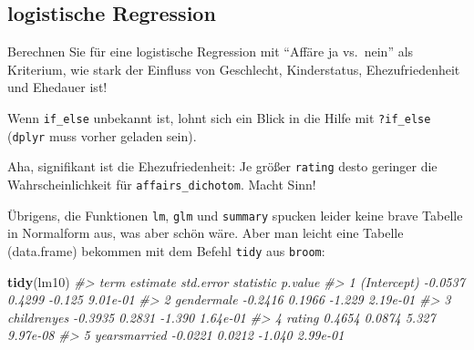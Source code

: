 \documentclass[12pt,ngerman,]{book}
\makeatletter
\newenvironment{Shaded}{\begin{snugshade}}{\end{snugshade}}
\newcommand{\KeywordTok}[1]{\textcolor[rgb]{0.13,0.29,0.53}{\textbf{#1}}}
\newcommand{\DataTypeTok}[1]{\textcolor[rgb]{0.13,0.29,0.53}{#1}}
\newcommand{\DecValTok}[1]{\textcolor[rgb]{0.00,0.00,0.81}{#1}}
\newcommand{\StringTok}[1]{\textcolor[rgb]{0.31,0.60,0.02}{#1}}
\newcommand{\CommentTok}[1]{\textcolor[rgb]{0.56,0.35,0.01}{\textit{#1}}}
\newcommand{\OperatorTok}[1]{\textcolor[rgb]{0.81,0.36,0.00}{\textbf{#1}}}
\newcommand{\NormalTok}[1]{#1}
\newenvironment{kframe}{%
\medskip{}
\setlength{\fboxsep}{.8em}
 \def\at@end@of@kframe{}%
 \ifinner\ifhmode%
  \def\at@end@of@kframe{\end{minipage}}%
  \begin{minipage}{\columnwidth}%
 \fi\fi%
 \def\FrameCommand##1{\hskip\@totalleftmargin \hskip-\fboxsep
 \colorbox{shadecolor}{##1}\hskip-\fboxsep
     \hskip-\linewidth \hskip-\@totalleftmargin \hskip\columnwidth}%
 \MakeFramed {\advance\hsize-\width
   \@totalleftmargin\z@ \linewidth\hsize
   \@setminipage}}%
 {\par\unskip\endMakeFramed%
 \at@end@of@kframe}
\renewenvironment{Shaded}{\begin{kframe}}{\end{kframe}}
\theoremstyle{definition}
\theoremstyle{definition}
\theoremstyle{remark}
\makeatother
\begin{document}
\subsection{logistische Regression}\label{logistische-regression-1}

Berechnen Sie für eine logistische Regression mit ``Affäre ja vs.~nein''
als Kriterium, wie stark der Einfluss von Geschlecht, Kinderstatus,
Ehezufriedenheit und Ehedauer ist!

\begin{Shaded}
\end{Shaded}

Wenn \texttt{if\_else} unbekannt ist, lohnt sich ein Blick in die Hilfe
mit \texttt{?if\_else} (\texttt{dplyr} muss vorher geladen sein).

Aha, signifikant ist die Ehezufriedenheit: Je größer \texttt{rating}
desto geringer die Wahrscheinlichkeit für \texttt{affairs\_dichotom}.
Macht Sinn!

Übrigens, die Funktionen \texttt{lm}, \texttt{glm} und \texttt{summary}
spucken leider keine brave Tabelle in Normalform aus, was aber schön
wäre. Aber man leicht eine Tabelle (data.frame) bekommen mit dem Befehl
\texttt{tidy} aus \texttt{broom}:

\begin{Shaded}
\begin{Highlighting}[]
\KeywordTok{tidy}\NormalTok{(lm10) }
\CommentTok{#>           term estimate std.error statistic  p.value}
\CommentTok{#> 1  (Intercept)  -0.0537    0.4299    -0.125 9.01e-01}
\CommentTok{#> 2   gendermale  -0.2416    0.1966    -1.229 2.19e-01}
\CommentTok{#> 3  childrenyes  -0.3935    0.2831    -1.390 1.64e-01}
\CommentTok{#> 4       rating   0.4654    0.0874     5.327 9.97e-08}
\CommentTok{#> 5 yearsmarried  -0.0221    0.0212    -1.040 2.99e-01}
\end{Highlighting}
\end{Shaded}
\end{document}
